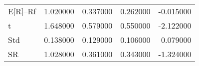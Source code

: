 \begin{tabular}{lrrrr}
\toprule
\midrule
E[R]--Rf & 1.020000 & 0.337000 & 0.262000 & -0.015000 \\
t & 1.648000 & 0.579000 & 0.550000 & -2.122000 \\
Std & 0.138000 & 0.129000 & 0.106000 & 0.079000 \\
SR & 1.028000 & 0.361000 & 0.343000 & -1.324000 \\
\bottomrule
\end{tabular}
